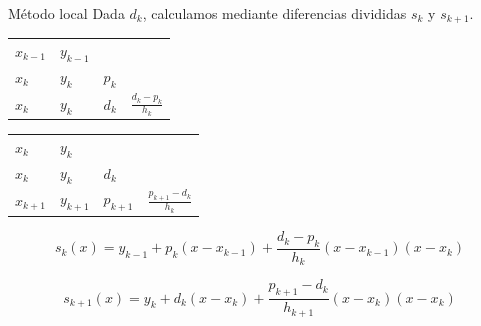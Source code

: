 \documentclass[compress]{beamer}
\theoremstyle{definition}
\begin{document}
\begin{frame}{Método local}
Dada $d_k$, calculamos mediante diferencias divididas $s_k$ y $s_{k+1}$.

\vfill


\vfill

\begin{overprint}
\begin{table}[h]
\centering
\begin{tabular}{llll}
$x_{k-1}$ & $y_{k-1}$ & & \\
$x_k$ & $y_k$ & $p_k$ & \\
$x_k$ & $y_k$ & $d_k$ & $\frac{d_k-p_k}{h_k}$
\end{tabular}
\end{table}

\begin{table}[h]
\centering
\begin{tabular}{llll}
$x_k$ & $y_k$ & & \\
$x_k$ & $y_k$ & $d_k$ & \\
$x_{k+1}$ & $y_{k+1}$ & $p_{k+1}$ & $\frac{p_{k+1}-d_k}{h_k}$
\end{tabular}
\end{table}
\end{overprint}

\begin{overprint}
\begin{equation*}
s_k(x)=y_{k-1}+p_k(x-x_{k-1})+\frac{d_k-p_k}{h_k}(x-x_{k-1})(x-x_k)
\end{equation*}

\begin{equation*}
s_{k+1}(x)=y_k+d_k(x-x_k)+\frac{p_{k+1}-d_k}{h_{k+1}}(x-x_k)(x-x_k)
\end{equation*}
\end{overprint}
\end{frame}
\end{document}

